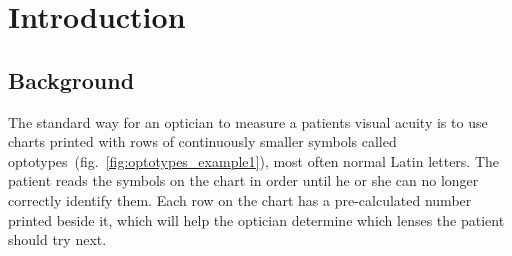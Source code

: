 \documentclass[12pt,a4paper,notitlepage]{report}
\begin{document}
\renewcommand\thechapter{\arabic{chapter}}
\setcounter{page}{1}
\chapter{ Introduction}
\section{Background}
The standard way for an optician to measure a patients visual acuity is to use charts printed with rows of continuously smaller symbols called optotypes~(fig.~\ref{fig:optotypes_example1}), most often normal Latin letters. The patient reads the symbols on the chart in order until he or she can no longer correctly identify them. Each row on the chart has a pre-calculated number printed beside it, which will help the optician determine which lenses the patient should try next.
\end{document}

